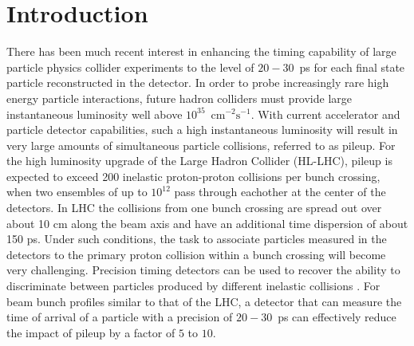 \section{Introduction} 

There has been much recent interest in enhancing the timing capability of large 
particle physics collider experiments to the level of $20-30$~ps for each final state particle
reconstructed in the detector.
In order to probe increasingly rare high energy particle interactions, future hadron colliders must provide large 
instantaneous luminosity well above $10^{35}$~$\mathrm{cm}^{-2}\mathrm{s}^{-1}$.
With current accelerator and particle detector capabilities, such a high 
instantaneous luminosity will result in very large amounts
of simultaneous particle collisions, referred to as pileup. 
For the high luminosity upgrade of the Large Hadron Collider (HL-LHC), pileup is expected to exceed 200 inelastic proton-proton collisions per
bunch crossing, when two ensembles of up to $10^{12}$ pass through eachother at the center of the detectors.
In LHC the collisions from one bunch crossing are spread out over about 10 cm along the beam axis and have
an additional time dispersion of about 150 ps.
Under such conditions, the task to associate particles measured in the detectors to the primary proton
collision within a bunch crossing will become very challenging. 
Precision timing detectors can be used to recover the ability to 
discriminate between particles produced by different inelastic collisions \cite{adielba}.
For beam bunch profiles similar to that of the LHC, a detector 
that can measure the time of arrival of a particle
with a precision of $20-30$~ps can effectively reduce the impact of
pileup by a factor of $5$ to $10$. 

